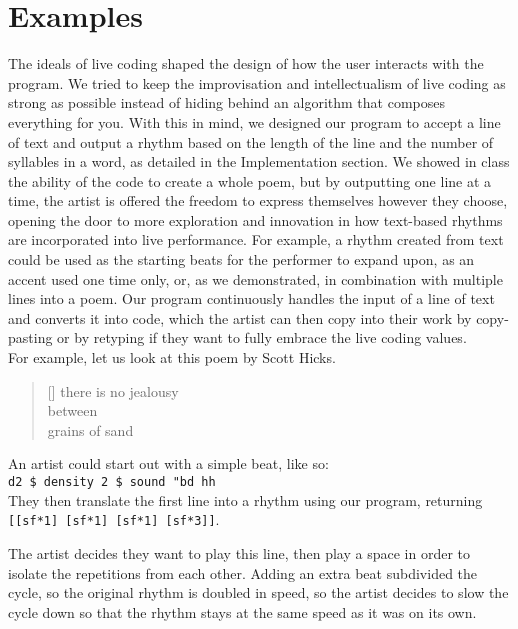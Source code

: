 \documentclass[11pt]{sigplanconf}
\begin{document}
\section{Examples}

The ideals of live coding shaped the design of how the user interacts with the program. We tried to keep the improvisation and intellectualism of live coding as strong as possible instead of hiding behind an algorithm that composes everything for you. With this in mind, we designed our program to accept a line of text and output a rhythm based on the length of the line and the number of syllables in a word, as detailed in the Implementation section. We showed in class the ability of the code to create a whole poem, but by outputting one line at a time, the artist is offered the freedom to express themselves however they choose, opening the door to more exploration and innovation in how text-based rhythms are incorporated into live performance. For example, a rhythm created from text could be used as the starting beats for the performer to expand upon, as an accent used one time only, or, as we demonstrated, in combination with multiple lines into a poem. Our program continuously handles the input of a line of text and converts it into code, which the artist can then copy into their work by copy-pasting or by retyping if they want to fully embrace the live coding values.\\

For example, let us look at this poem by Scott Hicks.\\

\settowidth{\versewidth}{There is no jealousy}
\begin{verse}[\versewidth]
there is no jealousy \\
between \\
grains of sand \\
\end{verse}

An artist could start out with a simple beat, like so: \\

\texttt{d2 \$ density 2 \$ sound "bd hh } \\

They then translate the first line into a rhythm using our program, returning \texttt{[[sf*1] [sf*1] [sf*1] [sf*3]]}.

The artist decides they want to play this line, then play a space in order to isolate the repetitions from each other. Adding an extra beat subdivided the cycle, so the original rhythm is doubled in speed, so the artist decides to slow the cycle down so that the rhythm stays at the same speed as it was on its own. \\
\end{document}
